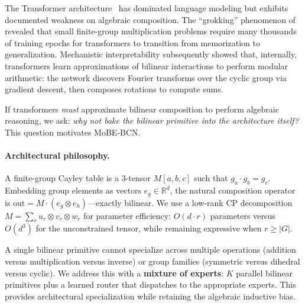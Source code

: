 \documentclass[11pt]{article}
\begin{document}
The Transformer architecture~\citep{vaswani2017attention} has dominated
language modeling but exhibits documented weakness on algebraic
composition. The ``grokking'' phenomenon of \citet{power2022grokking}
revealed that small finite-group multiplication problems require many
thousands of training epochs for transformers to transition from
memorization to generalization. Mechanistic interpretability
\citep{nanda2023progress} subsequently showed that, internally,
transformers learn approximations of bilinear interactions to perform
modular arithmetic: the network discovers Fourier transforms over the
cyclic group via gradient descent, then composes rotations to compute
sums.

If transformers \emph{must} approximate bilinear composition to perform
algebraic reasoning, we ask: \emph{why not bake the bilinear primitive
into the architecture itself?} This question motivates MoBE-BCN.

\paragraph{Architectural philosophy.}
A finite-group Cayley table is a 3-tensor $M[a, b, c]$ such that
$g_a \cdot g_b = g_c$. Embedding group elements as vectors
$e_g \in \mathbb{R}^d$, the natural composition operator is
$\text{out} = M \cdot (e_g \otimes e_h)$---exactly bilinear. We use a
low-rank CP decomposition $M = \sum_r u_r \otimes v_r \otimes w_r$ for
parameter efficiency: $O(d \cdot r)$ parameters versus $O(d^3)$ for the
unconstrained tensor, while remaining expressive when $r \geq |G|$.

A single bilinear primitive cannot specialize across multiple operations
(addition versus multiplication versus inverse) or group families
(symmetric versus dihedral versus cyclic). We address this with a
\textbf{mixture of experts}: $K$ parallel bilinear primitives plus a
learned router that dispatches to the appropriate experts. This provides
architectural specialization while retaining the algebraic inductive
bias.
\end{document}
